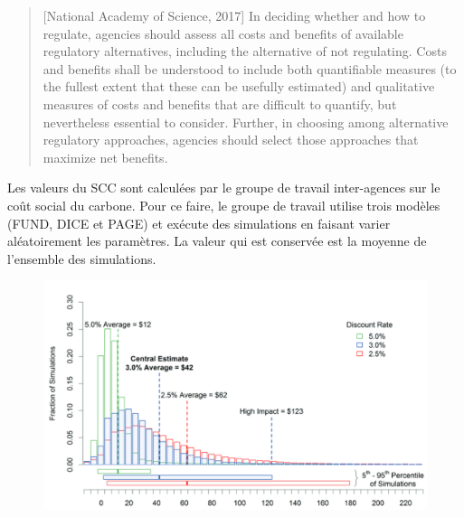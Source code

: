 \begin{quote}[National Academy of Science, 2017]
     In deciding whether and how to regulate, agencies should assess all costs and benefits of available regulatory alternatives, including the alternative of not regulating. Costs and benefits shall be understood to include both quantifiable measures (to the fullest extent that these can be usefully estimated) and qualitative measures of costs and benefits that are difficult to quantify, but nevertheless essential to consider. Further, in choosing among alternative regulatory approaches, agencies should select those approaches that maximize net benefits. 
\end{quote}

Les valeurs du SCC sont calculées par le groupe de travail inter-agences sur le coût social du carbone. Pour ce faire, le groupe de travail utilise trois modèles (FUND, DICE et PAGE) et exécute des simulations en faisant varier aléatoirement les paramètres. La valeur qui est conservée est la moyenne de l'ensemble des simulations. 

\begin{figure}
    \centering
    \includegraphics[width=0.9\linewidth]{figures/scc.png}
    \label{fig:scc}
\end{figure}


